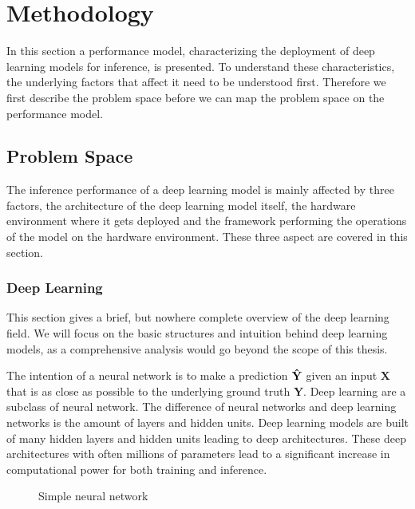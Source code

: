 \chapter{Methodology}
\label{chap:methodology}
In this section a performance model, characterizing the deployment of deep learning models for inference, is presented. To understand these characteristics, the underlying factors that affect it need to be understood first. Therefore we first describe the problem space before we can map the problem space on the performance model.


\section{Problem Space}
The inference performance of a deep learning model is mainly affected by three factors, the architecture of the deep learning model itself, the hardware environment where it gets deployed and the framework performing the operations of the model on the hardware environment.
These three aspect are covered in this section.


\subsection{Deep Learning}
This section gives a brief, but nowhere complete overview of the deep learning field. We will focus on the basic structures and intuition behind deep learning models, as a comprehensive analysis would go beyond the scope of this thesis.

The intention of a neural network is to make a prediction $\mathbf{\Hat{Y}}$ given an input $\mathbf{X}$ that is as close as possible to the underlying ground truth $\mathbf{Y}$. 
Deep learning are a subclass of neural network.
The difference of neural networks and deep learning networks is the amount of layers and hidden units. Deep learning models are built of many hidden layers and hidden units leading to deep architectures.
These deep architectures with often millions of parameters lead to a significant increase in computational power for both training and inference.
\begin{figure}[!htb]
    \centering
    \resizebox{.8\linewidth}{!}{}
    \caption{Simple neural network}
    \label{fig:simpleNN}
\end{figure}

